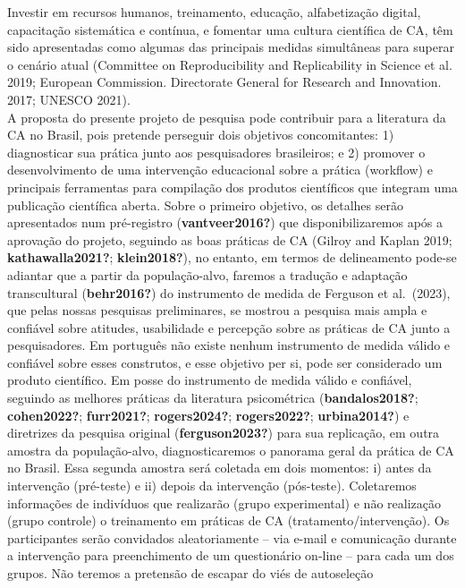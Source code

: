 \documentclass[
  a4paper,
]{article}
\begin{document}
Investir em recursos humanos, treinamento, educação, alfabetização
digital, capacitação sistemática e contínua, e fomentar uma cultura
científica de CA, têm sido apresentadas como algumas das principais
medidas simultâneas para superar o cenário atual (Committee on
Reproducibility and Replicability in Science et al. 2019; European
Commission. Directorate General for Research and Innovation. 2017;
UNESCO 2021).\\
A proposta do presente projeto de pesquisa pode contribuir para a
literatura da CA no Brasil, pois pretende perseguir dois objetivos
concomitantes: 1) diagnosticar sua prática junto aos pesquisadores
brasileiros; e 2) promover o desenvolvimento de uma intervenção
educacional sobre a prática (workflow) e principais ferramentas para
compilação dos produtos científicos que integram uma publicação
científica aberta. Sobre o primeiro objetivo, os detalhes serão
apresentados num pré-registro (\textbf{vantveer2016?}) que
disponibilizaremos após a aprovação do projeto, seguindo as boas
práticas de CA (Gilroy and Kaplan 2019; \textbf{kathawalla2021?};
\textbf{klein2018?}), no entanto, em termos de delineamento pode-se
adiantar que a partir da população-alvo, faremos a tradução e adaptação
transcultural (\textbf{behr2016?}) do instrumento de medida de Ferguson
et al.~(2023), que pelas nossas pesquisas preliminares, se mostrou a
pesquisa mais ampla e confiável sobre atitudes, usabilidade e percepção
sobre as práticas de CA junto a pesquisadores. Em português não existe
nenhum instrumento de medida válido e confiável sobre esses construtos,
e esse objetivo per si, pode ser considerado um produto científico. Em
posse do instrumento de medida válido e confiável, seguindo as melhores
práticas da literatura psicométrica (\textbf{bandalos2018?};
\textbf{cohen2022?}; \textbf{furr2021?}; \textbf{rogers2024?};
\textbf{rogers2022?}; \textbf{urbina2014?}) e diretrizes da pesquisa
original (\textbf{ferguson2023?}) para sua replicação, em outra amostra
da população-alvo, diagnosticaremos o panorama geral da prática de CA no
Brasil. Essa segunda amostra será coletada em dois momentos: i) antes da
intervenção (pré-teste) e ii) depois da intervenção (pós-teste).
Coletaremos informações de indivíduos que realizarão (grupo
experimental) e não realização (grupo controle) o treinamento em
práticas de CA (tratamento/intervenção). Os participantes serão
convidados aleatoriamente -- via e-mail e comunicação durante a
intervenção para preenchimento de um questionário on-line -- para cada
um dos grupos. Não teremos a pretensão de escapar do viés de autoseleção
\end{document}
